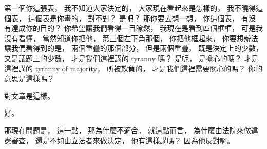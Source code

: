 \hypertarget{w06:cue:3060}{}第一個你這張表，
\hypertarget{w06:cue:3061}{}我不知道大家決定的，
\hypertarget{w06:cue:3062}{}大家現在看起來是怎樣的，
\hypertarget{w06:cue:3063}{}我不曉得這個表，
\hypertarget{w06:cue:3064}{}這個表是你畫的，
\hypertarget{w06:cue:3065}{}對不對？
\hypertarget{w06:cue:3066}{}是吧？
\hypertarget{w06:cue:3067}{}那你要去想一想，
\hypertarget{w06:cue:3068}{}你這個表，
\hypertarget{w06:cue:3069}{}有沒有達成你的目的？
\hypertarget{w06:cue:3070}{}你希望讓我們看得一目瞭然，
\hypertarget{w06:cue:3071}{}我現在是看到四個框框，
\hypertarget{w06:cue:3072}{}可是我沒有看懂，
\hypertarget{w06:cue:3073}{}當然知道你把他，
\hypertarget{w06:cue:3074}{}第三個左下角那個，
\hypertarget{w06:cue:3075}{}你把他框起來，
\hypertarget{w06:cue:3076}{}你要想辦法讓我們看得到的是，
\hypertarget{w06:cue:3077}{}兩個重疊的那個部分，
\hypertarget{w06:cue:3078}{}但是兩個重疊，
\hypertarget{w06:cue:3079}{}既是決定上的少數，
\hypertarget{w06:cue:3080}{}又是議題上的少數，
\hypertarget{w06:cue:3081}{}才是我們這裡講的 tyranny 嗎？
\hypertarget{w06:cue:3082}{}是呢，
\hypertarget{w06:cue:3083}{}是擔心的嗎？
\hypertarget{w06:cue:3084}{}才是這裡講的 tyranny of majority，
\hypertarget{w06:cue:3085}{}所被欺負的，
\hypertarget{w06:cue:3086}{}才是我們這裡需要關心的嗎？
\hypertarget{w06:cue:3087}{}你的意思是這樣嗎？

\hypertarget{w06:cue:3088}{}對文章是這樣。

\hypertarget{w06:cue:3089}{}好。

\hypertarget{w06:cue:3090}{}那現在問題是，
\hypertarget{w06:cue:3091}{}這一點，
\hypertarget{w06:cue:3092}{}那為什麼不適合，
\hypertarget{w06:cue:3093}{}就這點而言，
\hypertarget{w06:cue:3094}{}為什麼由法院來做違憲審查，
\hypertarget{w06:cue:3095}{}還是不如由立法者來做決定，
\hypertarget{w06:cue:3096}{}他有這樣講嗎？
\hypertarget{w06:cue:3097}{}因為他反對啊。


